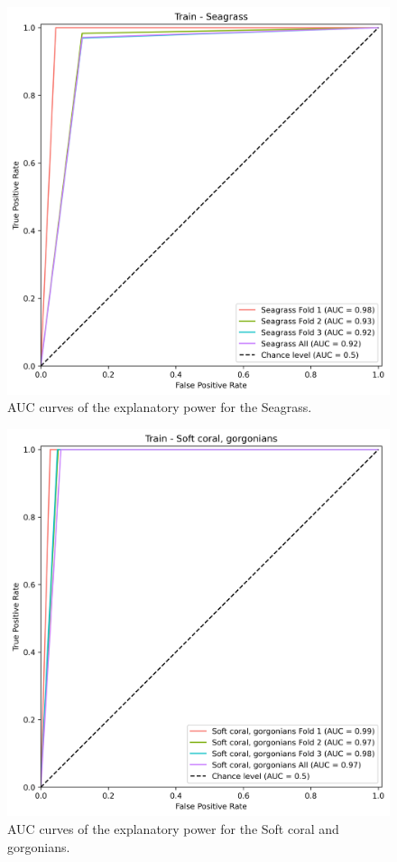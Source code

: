 \begin{figure}
\hypertarget{fig:chap3figS18}{%
\centering
\includegraphics{03-Chapitre3/figures/supplementary/03-receiver_operator_curve_train_rf_Seagrass.png}
\caption{AUC curves of the explanatory power for the
Seagrass.}\label{fig:chap3figS18}
}
\end{figure}

\begin{figure}
\hypertarget{fig:chap3figS19}{%
\centering
\includegraphics{03-Chapitre3/figures/supplementary/03-receiver_operator_curve_train_rf_Soft coral, gorgonians.png}
\caption{AUC curves of the explanatory power for the Soft coral and
gorgonians.}\label{fig:chap3figS19}
}
\end{figure}

